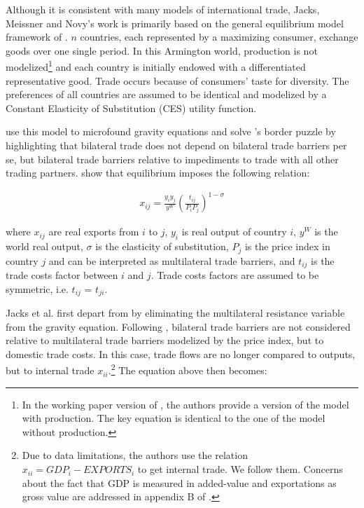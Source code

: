\documentclass{article}
\begin{document}
Although it is consistent with many models of international
trade, Jacks, Meissner and Novy's work is primarily based on
the general equilibrium model framework of \cite{AW2003}. $n$
countries, each represented by a maximizing consumer, exchange
goods over one single period. In this Armington world,
production is not modelized\footnote{In the working paper
version of \cite{JMN2010}, the authors provide a version of the
model with production. The key equation is identical to the one
of the model without production.} and each country is initially
endowed with a differentiated representative good. Trade occurs
because of consumers' taste for diversity. The preferences of
all countries are assumed to be identical and modelized by a
Constant Elasticity of Substitution (CES) utility function.

\cite{AW2003} use this model to microfound gravity equations
and solve \cite{MAC}'s border puzzle by highlighting that
bilateral trade does not depend on bilateral trade barriers per
se, but bilateral trade barriers relative to impediments to
trade with all other trading partners. \cite{AW2003} show that
equilibrium imposes the following relation:

\begin{eqnarray}
x_{ij}=\frac{y_i y_j}{y^W}\left(\frac{t_{ij}}{P_i P_j}\right)^{1-\sigma}
\end{eqnarray}

where $x_{ij}$ are real exports from $i$ to $j$, $y_i$ is real
output of country $i$, $y^W$ is the world real output, $\sigma$
is the elasticity of substitution, $P_j$ is the price index in
country $j$ and can be interpreted as multilateral trade
barriers, and $t_{ij}$ is the trade costs factor between $i$
and $j$. Trade costs factors are assumed to be symmetric, i.e.
$t_{ij}$ = $t_{ji}$.

Jacks et al. first depart from \cite{AW2003} by eliminating the
multilateral resistance variable from the gravity equation.
Following \cite{NOVY}, bilateral trade barriers are not
considered relative to multilateral trade barriers modelized by
the price index, but to domestic trade costs. In this case,
trade flows are no longer compared to outputs, but to internal
trade $x_{ii}$.\footnote{Due to data limitations, the authors
use the relation $x_{ii}=GDP_i-EXPORTS_i$ to get internal
trade. We follow them. Concerns about the fact that GDP is
measured in added-value and exportations as gross value are
addressed in appendix B of \cite{JMN2011}.} The equation above
then becomes:
\end{document}
